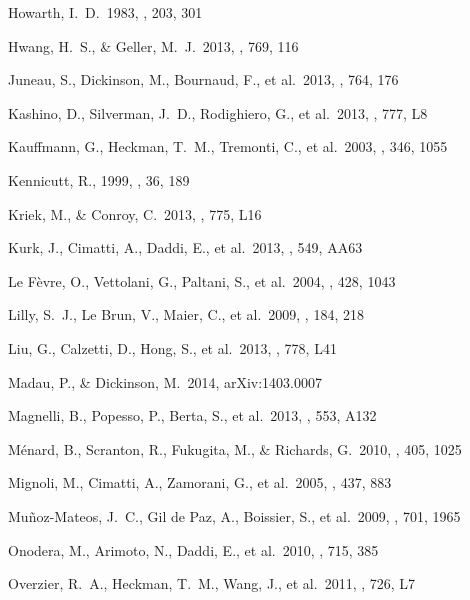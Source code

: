 \documentclass[preprint]{aastex}
\begin{document}
\begin{thebibliography}
 Howarth, I.~D.\ 1983, \mnras, 203, 301

 Hwang, H.~S., \& Geller, M.~J.\ 2013,
\apj, 769, 116

 Juneau, S., Dickinson, 
M., Bournaud, F., et al.\ 2013, \apj, 764, 176

 Kashino, D., Silverman, 
J.~D., Rodighiero, G., et al.\ 2013, \apjl, 777, L8

 Kauffmann, G., 
Heckman, T.~M., Tremonti, C., et al.\ 2003, \mnras, 346, 1055

 Kennicutt, R., 1999, \araa, 36, 189

 Kriek, M., \& Conroy, C.\ 2013,
\apjl, 775, L16 

 Kurk, J., Cimatti, A., Daddi, E., et al.\
2013, \aap, 549, AA63

 Le F{\`e}vre, O., Vettolani, G.,
Paltani, S., et al.\ 2004, \aap, 428, 1043

 Lilly, S.~J., Le Brun, V.,
Maier, C., et al.\ 2009, \apjs, 184, 218

 Liu, G., Calzetti, D., 
Hong, S., et al.\ 2013, \apjl, 778, L41

 Madau, P., \& Dickinson, M.\ 2014,
arXiv:1403.0007

 Magnelli, B., Popesso, P.,
Berta, S., et al.\ 2013, \aap, 553, A132

 M{\'e}nard, B., Scranton, R.,
Fukugita, M., \& Richards, G.\ 2010, \mnras, 405, 1025

 Mignoli, M., Cimatti, A., Zamorani,
G., et al.\ 2005, \aap, 437, 883

Mu{\~n}oz-Mateos, J.~C., Gil de Paz, A., Boissier, S., et al.\ 2009, \apj, 
701, 1965

 Onodera, M., Arimoto, 
N., Daddi, E., et al.\ 2010, \apj, 715, 385

 Overzier, R.~A., 
Heckman, T.~M., Wang, J., et al.\ 2011, \apjl, 726, L7 


\end{thebibliography}
\end{document}
